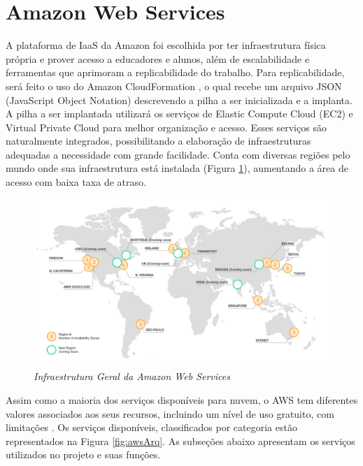 \documentclass[tg]{mdtufsm}
\begin{document}
\section{Amazon Web Services}

A plataforma de IaaS da Amazon foi escolhida por ter infraestrutura física própria e prover acesso a educadores e alunos, além de escalabilidade e ferramentas que aprimoram a replicabilidade do trabalho. Para replicabilidade, será feito o uso do Amazon CloudFormation \cite{awscf}, o qual recebe um arquivo JSON (JavaScript Object Notation) descrevendo a pilha a ser inicializada e a implanta. A pilha a ser implantada utilizará os serviços de Elastic Compute Cloud (EC2)\cite{awsec2} e Virtual Private Cloud\cite{vpc} para melhor organização e acesso. Esses serviços são naturalmente integrados, possibilitando a elaboração de infraestruturas adequadas a necessidade com grande facilidade. Conta com diversas regiões pelo mundo onde sua infraestrutura está instalada (Figura \ref{fig:awsInfra}), aumentando a área de acesso com baixa taxa de atraso.

\begin{figure}
	\centering
	\includegraphics[width=1\textwidth]{aws-infrastructure}
	\caption{\emph{Infraestrutura Geral da Amazon Web Services \cite{awsinfra}}}
	\label{fig:awsInfra}
\end{figure}

Assim como a maioria dos serviços disponíveis para nuvem, o AWS tem diferentes valores associados aos seus recursos, incluindo um nível de uso gratuito, com limitações \cite{ec2price}. Os serviços disponíveis, classificados por categoria estão representados na Figura \ref{fig:awsArq}. As subseções abaixo apresentam os serviços utilizados no projeto e suas funções.
\end{document}
